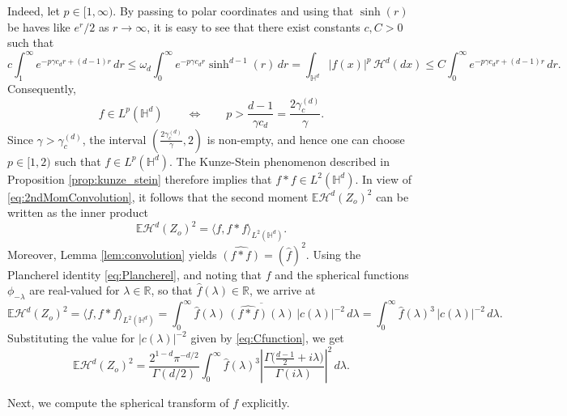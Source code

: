 \documentclass[11pt,a4paper]{article}
\theoremstyle{plain}
\theoremstyle{definition}
\theoremstyle{remark}
\def\EE{\mathbb{E}}
\def\HH{\mathbb{H}}
\def\RR{\mathbb{R}}
\def\cH{\mathcal{H}}
\newcommand{\E}{\mathbb{E}}
\begin{document}
Indeed, let $p\in[1,\infty)$.
By passing to polar coordinates and using that $\sinh(r)$ be haves like $e^r/2$ as $r\to\infty$, it is easy to see that there exist constants $c,C>0$ such that
\[
c\int_1^\infty e^{-p\gamma c_d r+(d-1)r}\,dr
\leq
\omega_d\int_0^\infty e^{-p\gamma c_d r}\sinh^{d-1}(r)\,dr
=
\int_{\HH^d} |f(x)|^p\,\cH^d(dx)
\leq
C\int_0^\infty e^{-p\gamma c_d r+(d-1)r}\,dr.
\]
Consequently,
\[
f\in L^p(\HH^d)
\qquad\Longleftrightarrow\qquad
p>\frac{d-1}{\gamma c_d}
=
\frac{2\gamma_c^{(d)}}{\gamma}.
\]
Since $\gamma>\gamma_c^{(d)}$, the interval $(\frac{2\gamma_c^{(d)}}{\gamma},2)$
is non-empty, and hence one can choose $p\in[1,2)$ such that $f\in L^p(\HH^d)$.
The Kunze-Stein phenomenon described in Proposition \ref{prop:kunze_stein} therefore implies that
$f*f\in L^2(\HH^d)$.
In view of \eqref{eq:2ndMomConvolution}, it follows that the second moment $\E\cH^d(Z_o)^2$ can be written as the inner product
\[
\E\cH^d(Z_o)^2=\langle f,f*f\rangle_{L^2(\HH^d)}.
\]
Moreover, Lemma \ref{lem:convolution} yields $\widehat{(f*f)}=(\widehat f)^2$.
Using the Plancherel identity \eqref{eq:Plancherel}, and noting that $f$ and the spherical functions $\phi_{-\lambda}$ are real-valued for $\lambda\in\RR$, so that $\widehat f(\lambda)\in\RR$, we arrive at
\begin{equation}\label{eq:second_moment_help1}
\EE\cH^d(Z_o)^2
=
\langle f,f*f\rangle_{L^2(\HH^d)}
=
\int_0^\infty \widehat f(\lambda)\,\overline{\widehat{(f*f)}(\lambda)}\,|c(\lambda)|^{-2}\,d\lambda
=
\int_0^\infty \widehat f(\lambda)^3\,|c(\lambda)|^{-2}\,d\lambda.
\end{equation}
Substituting the value for $|c(\lambda)|^{-2}$ given by \eqref{eq:Cfunction}, we get
\begin{equation}\label{eq:2ndMomAfterSphTrafo_d}
	\EE\cH^d(Z_o)^2 = \frac{2^{1-d}\pi^{-d/2}}{\Gamma(d/2)} \int_0^\infty \widehat f(\lambda)^3 \left|\frac{\Gamma\bigl(\frac{d-1}{2}+i\lambda\bigr)}{\Gamma(i\lambda)}\right|^2\,d\lambda.
\end{equation}

Next, we compute the spherical transform of $f$ explicitly.
\end{document}
